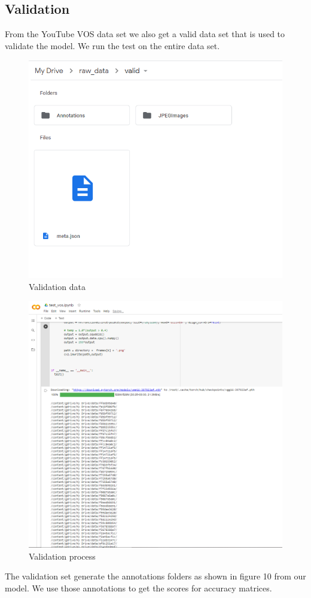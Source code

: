 \documentclass[conference]{IEEEtran}
\begin{document}
\subsection{Validation}
From the YouTube VOS data set we also get a valid data set that is used to validate the model. We run the test on the entire data set. 
\begin{figure}[h!]
\centering
\includegraphics[scale=.5]{valid set.png}
\caption{Validation data}
\label{fig:recons}
\end{figure}
\newline
\begin{figure}[h!]
\centering
\includegraphics[scale=.5]{test_code.png}
\caption{Validation process}
\label{fig:recons}
\end{figure}
\newline
The validation set generate the annotations folders as shown in figure 10 from our model. We use those annotations to get the scores for accuracy matrices.
\end{document}
